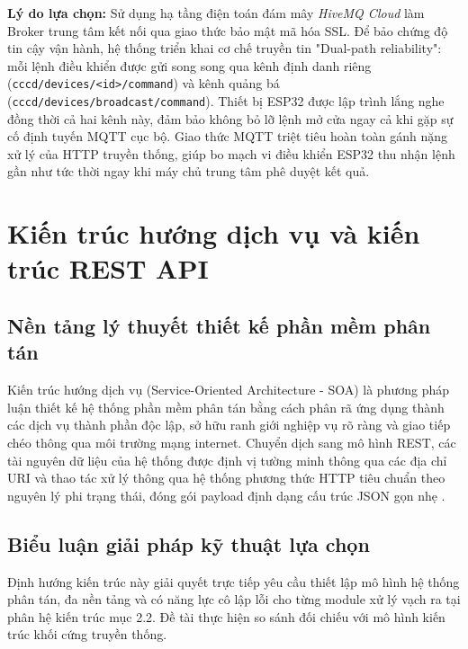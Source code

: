 \documentclass[../DoAn.tex]{subfiles}
\begin{document}
\textbf{Lý do lựa chọn:} Sử dụng hạ tầng điện toán đám mây \textit{HiveMQ Cloud} làm Broker trung tâm kết nối qua giao thức bảo mật mã hóa SSL. Để bảo chứng độ tin cậy vận hành, hệ thống triển khai cơ chế truyền tin "Dual-path reliability": mỗi lệnh điều khiển được gửi song song qua kênh định danh riêng (\texttt{cccd/devices/<id>/command}) và kênh quảng bá (\texttt{cccd/devices/broadcast/command}). Thiết bị ESP32 được lập trình lắng nghe đồng thời cả hai kênh này, đảm bảo không bỏ lỡ lệnh mở cửa ngay cả khi gặp sự cố định tuyến MQTT cục bộ. Giao thức MQTT triệt tiêu hoàn toàn gánh nặng xử lý của HTTP truyền thống, giúp bo mạch vi điều khiển ESP32 thu nhận lệnh gần như tức thời ngay khi máy chủ trung tâm phê duyệt kết quả.

\clearpage

\section{Kiến trúc hướng dịch vụ và kiến trúc REST API}
\label{section:3.4}

\subsection{Nền tảng lý thuyết thiết kế phần mềm phân tán}

Kiến trúc hướng dịch vụ (Service-Oriented Architecture - SOA) là phương pháp luận thiết kế hệ thống phần mềm phân tán bằng cách phân rã ứng dụng thành các dịch vụ thành phần độc lập, sở hữu ranh giới nghiệp vụ rõ ràng và giao tiếp chéo thông qua môi trường mạng internet. Chuyển dịch sang mô hình REST, các tài nguyên dữ liệu của hệ thống được định vị tường minh thông qua các địa chỉ URI và thao tác xử lý thông qua hệ thống phương thức HTTP tiêu chuẩn theo nguyên lý phi trạng thái, đóng gói payload định dạng cấu trúc JSON gọn nhẹ \cite{fielding2000}.

\subsection{Biểu luận giải pháp kỹ thuật lựa chọn}

Định hướng kiến trúc này giải quyết trực tiếp yêu cầu thiết lập mô hình hệ thống phân tán, đa nền tảng và có năng lực cô lập lỗi cho từng module xử lý vạch ra tại phân hệ kiến trúc mục 2.2. Đề tài thực hiện so sánh đối chiếu với mô hình kiến trúc khối cứng truyền thống.
\end{document}
